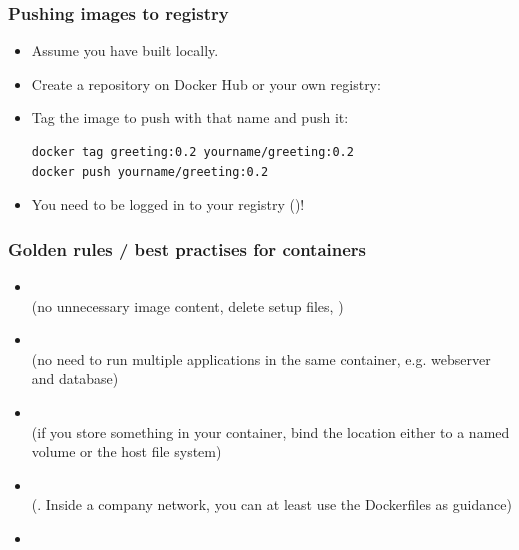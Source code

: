 \begin{frame}[fragile]
	\frametitle{Pushing images to registry}
	\begin{itemize}
		\item Assume you have built  locally.
		\item Create a repository on Docker Hub or your own registry: 
		\item Tag the image to push with that name and push it:
			\begin{lstlisting}
docker tag greeting:0.2 yourname/greeting:0.2
docker push yourname/greeting:0.2
			\end{lstlisting}
		\item You need to be logged in to your registry ()!
	\end{itemize}
	
	
	
\end{frame}
\begin{frame}
	\frametitle{Golden rules / best practises for containers}
	
	\begin{itemize}
		\item {}\\{\footnotesize(no unnecessary image content, delete setup files, )}
		\item {}\\{\footnotesize(no need to run multiple applications in the same container, e.g. webserver and database)}
		\item {}\\{\footnotesize(if you store something in your container, bind the location either to a named volume or the host file system)}
		\item {}\\ {\footnotesize(. Inside a company network, you can at least use the Dockerfiles as guidance)}
		\item {}\\ {\footnotesize {}}
	\end{itemize}
\end{frame}


